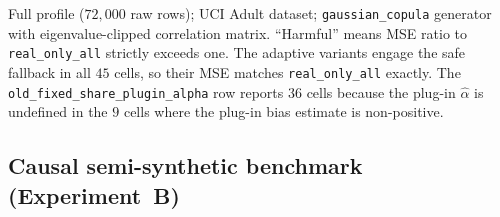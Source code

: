 \begin{table}[!t]
  \centering
  \caption{Tabular semi-synthetic performance summary (Experiment~A, full
  profile). Aggregates across the $45$ retained cells of the $n \times m$
  grid for the Adult-pseudo-population mean and subgroup gap.}
  \label{tab:tabular_perf}
  \begin{threeparttable}
  \begin{tablenotes}
    \small
    \item[a] Full profile ($72{,}000$ raw rows); UCI Adult dataset;
    \texttt{gaussian\_copula} generator with eigenvalue-clipped correlation
    matrix. ``Harmful'' means MSE ratio to \texttt{real\_only\_all} strictly
    exceeds one. The adaptive variants engage the safe fallback in all $45$
    cells, so their MSE matches \texttt{real\_only\_all} exactly. The
    \texttt{old\_fixed\_share\_plugin\_alpha} row reports $36$ cells because
    the plug-in $\hat\alpha$ is undefined in the $9$ cells where the
    plug-in bias estimate is non-positive.
  \end{tablenotes}
  \end{threeparttable}
\end{table}

\subsection{Causal semi-synthetic benchmark (Experiment~B)}\label{app:expB}

